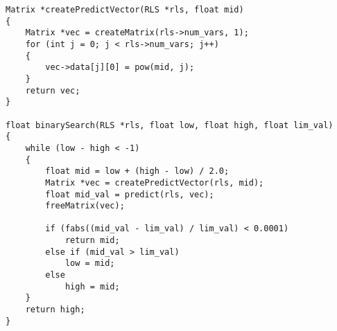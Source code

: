 \begin{lstlisting}[caption=\raggedright{mcu-libs/RLS.cpp}, frame=single]
Matrix *createPredictVector(RLS *rls, float mid)
{
    Matrix *vec = createMatrix(rls->num_vars, 1);
    for (int j = 0; j < rls->num_vars; j++)
    {
        vec->data[j][0] = pow(mid, j);
    }
    return vec;
}

float binarySearch(RLS *rls, float low, float high, float lim_val)
{
    while (low - high < -1)
    {
        float mid = low + (high - low) / 2.0;
        Matrix *vec = createPredictVector(rls, mid);
        float mid_val = predict(rls, vec);
        freeMatrix(vec);

        if (fabs((mid_val - lim_val) / lim_val) < 0.0001)
            return mid;
        else if (mid_val > lim_val)
            low = mid;
        else
            high = mid;
    }
    return high;
}
\end{lstlisting}
